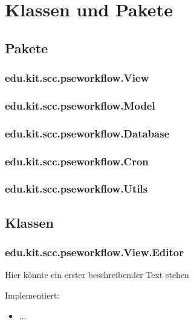 \chapter{Klassen und Pakete}

    \section{Pakete}
    
        \subsection{edu.kit.scc.pseworkflow.View}
        \subsection{edu.kit.scc.pseworkflow.Model}
        \subsection{edu.kit.scc.pseworkflow.Database}
        \subsection{edu.kit.scc.pseworkflow.Cron}
        \subsection{edu.kit.scc.pseworkflow.Utils}
        
    \section{Klassen}
    
        \subsection{edu.kit.scc.pseworkflow.View.Editor}
        
            Hier könnte ein erster beschreibender Text stehen
            
            Implementiert:
            \begin{itemize}
                \item ...
            \end{itemize}
            
